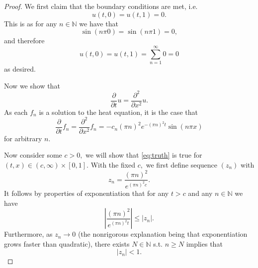 \documentclass[10pt]{article}
\begin{document}
\begin{proof}
    We first claim that the boundary conditions are met, i.e.
    \[u(t,0)=u(t,1)=0.\]
    This is as for any $n\in\mathbb{N}$ we have that
    \[\sin(n\pi0)=\sin(n\pi1) =0,\]
    and therefore
    \[u(t,0) = u(t,1) = \sum_{n=1}^{\infty} 0 = 0\]
    as desired.

    Now we show that
    \begin{equation} \label{eq:truth}
        \frac{\partial }{\partial t}u = \frac{\partial^2}{\partial x^2}u.
    \end{equation}
    As each $f_n$ is a solution to the heat equation, it is the case that
    \begin{equation} \label{eq:eq}
        \frac{\partial }{\partial t}f_n = \frac{\partial^2}{\partial x^2}f_n = -c_n(\pi n)^2e^{-(\pi n)^2t}\sin(n\pi x)
    \end{equation}
    for arbitrary $n$.

    Now consider some $c>0,$ we will show that \eqref{eq:truth} is true for $(t,x)\in (c, \infty)\times [0,1].$ With the fixed $c,$ we first define sequence $(z_n)$ with
    \begin{equation*}
        z_n = \frac{(\pi n)^2}{e^{(\pi n)^2c}}.
    \end{equation*}
    It follows by properties of exponentiation that for any $t>c$ and any $n\in\mathbb{N}$ we have
    \begin{equation} \label{eq:tz}
        \left | \frac{(\pi n)^2}{e^{(\pi n)^2t}} \right | \le |z_n|.
    \end{equation}
    Furthermore, as $z_n \to 0$ (the nonrigorous explanation being that exponentiation grows faster than quadratic), there exists $N\in\mathbb{N}$ s.t. $n\ge N$ implies that
    \begin{equation} \label{eq:less}
        |z_n| < 1.
    \end{equation}


\end{proof}
\end{document}

